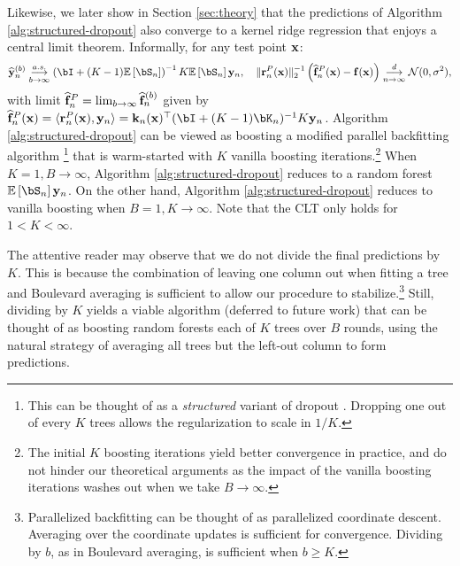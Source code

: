 Likewise, we later show in Section \ref{sec:theory} that the predictions of Algorithm \ref{alg:structured-dropout} also converge to a kernel ridge regression that enjoys a central limit theorem. Informally, for any test point $\mathbf{x}$:
$${\widehat{\by}^{(b)}_n \underset{b\to\infty}{\overset{a.s.}{\longrightarrow}} \left(\bI+ (K-1)\mathbb{E}\left[\bS_n\right]\right)^{-1} K\mathbb{E}\left[\bS_n\right]\by_n, \quad \lVert\br_n^P(\bx)\rVert_2^{-1}\left(\widehat{\f}_n^P(\bx) - \f(\bx)\right) \underset{n\to\infty}{\overset{d}{\longrightarrow}} \gN(0, \sigma^2)},$$
with limit $\widehat{\mathbf{f}}_{n}^P = \lim_{b \to \infty} \widehat{\mathbf{f}}^{(b)}_{n}$ given by $\widehat{\f}_{n}^P(\bx)= \langle\br_n^P(\bx), \by_n\rangle = \bk_n(\bx)^\top (\bI + (K-1)\bK_n)^{-1}K \by_n$. 
Algorithm \ref{alg:structured-dropout} can be viewed as boosting a modified parallel backfitting algorithm \citep{breiman1985backfitting}\footnote{This can be thought of as a \emph{structured} variant of dropout \citep{zhao2022revisitingstructureddropout, xin2020deebertdynamicearlyexitingdropout, fan2019reducingtransformerdepthdemanddropout}. Dropping one out of every $K$ trees allows the regularization to scale in $1/K$.} that is warm-started with $K$ vanilla boosting iterations.\footnote{The initial $K$ boosting iterations yield better convergence in practice, and do not hinder our theoretical arguments as the impact of the vanilla boosting iterations washes out when we take $B \to \infty$.} When $K=1, B\to\infty$, Algorithm \ref{alg:structured-dropout} reduces to a random forest $\mathbb{E}\left[\bS_n\right]\by_n$. On the other hand, Algorithm \ref{alg:structured-dropout} reduces to vanilla boosting when $B=1, K\to\infty$. Note that the CLT only holds for $1 < K < \infty$. 

The attentive reader may observe that we do not divide the final predictions by $K$. This is because the combination of leaving one column out when fitting a tree and Boulevard averaging is sufficient to allow our procedure to stabilize.\footnote{Parallelized backfitting can be thought of as parallelized coordinate descent. Averaging over the coordinate updates is sufficient for convergence. Dividing by $b$, as in Boulevard averaging, is sufficient when $b \geq K$.} Still, dividing by $K$ yields a viable algorithm (deferred to future work) that can be thought of as boosting random forests each of $K$ trees over $B$ rounds, using the natural strategy of averaging all trees but the left-out column to form predictions. 


